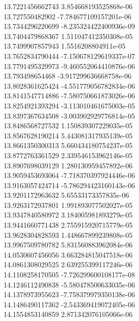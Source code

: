 {13.7221456662743 3.854668193525868e-06
 \\
13.727550482902 -7.784677109157201e-06
 \\
13.7344296220699 -8.235324422400936e-09
 \\
13.7404479868367 1.511047412350308e-05
 \\
13.7499907857943 1.5516208804911e-05
 \\
13.7652834790444 -7.150678129619337e-07
 \\
13.7791495329973 -9.460552064410876e-06
 \\
13.793498654468 -3.917299636668758e-06
 \\
13.8028361625424 -4.551779056782834e-06
 \\
13.8141547714886 -7.580750661873026e-06
 \\
13.8254921393294 -3.113010461675003e-05
 \\
13.8397367634508 -3.003902929776814e-05
 \\
13.8486568727532 1.150839307229035e-05
 \\
13.8567628190214 5.443081317935139e-05
 \\
13.8661350300313 5.660434180754237e-05
 \\
13.8772763361529 2.339546153962146e-05
 \\
13.8907698039129 1.280130959457892e-06
 \\
13.9059453693064 -7.718370397924446e-06
 \\
13.9163057424714 -5.786294423160143e-06
 \\
13.9201172963632 5.65533173357835e-06
 \\
13.9263172937801 1.991893077502027e-05
 \\
13.9347840580972 3.184005981893279e-05
 \\
13.9441660771438 2.755915920715779e-05
 \\
13.9628304828593 1.448667899239808e-05
 \\
13.9967509780782 5.831560883962084e-06
 \\
14.0530607456056 3.663284815047518e-06
 \\
14.0861308029525 2.639255399117246e-06
 \\
14.1108258170505 -7.726299600108177e-08
 \\
14.1246112490838 -5.580478500633035e-06
 \\
14.1378973955623 -7.758379979350138e-06
 \\
14.1486490117362 -2.543369419072405e-06
 \\
14.1554853140859 2.871342076105066e-06
}
